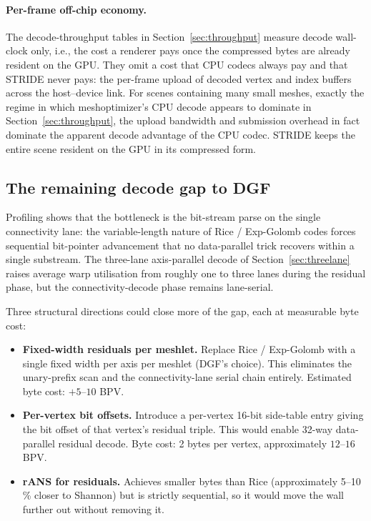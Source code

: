 \documentclass[pdflatex,sn-vancouver-num]{sn-jnl}%
\theoremstyle{thmstyleone}%
\theoremstyle{thmstyletwo}%
\theoremstyle{thmstylethree}%
\begin{document}
\paragraph{Per-frame off-chip economy.}
The decode-throughput tables in Section~\ref{sec:throughput} measure decode wall-clock only, i.e., the cost a renderer pays once the compressed bytes are already resident on the GPU. They omit a cost that CPU codecs always pay and that STRIDE never pays: the per-frame upload of decoded vertex and index buffers across the host--device link. For scenes containing many small meshes, exactly the regime in which meshoptimizer's CPU decode appears to dominate in Section~\ref{sec:throughput}, the upload bandwidth and submission overhead in fact dominate the apparent decode advantage of the CPU codec. STRIDE keeps the entire scene resident on the GPU in its compressed form.

\subsection{The remaining decode gap to DGF}\label{sec:gap}

Profiling shows that the bottleneck is the bit-stream parse on the single connectivity lane: the variable-length nature of Rice / Exp-Golomb codes forces sequential bit-pointer advancement that no data-parallel trick recovers within a single substream. The three-lane axis-parallel decode of Section~\ref{sec:threelane} raises average warp utilisation from roughly one to three lanes during the residual phase, but the connectivity-decode phase remains lane-serial.

Three structural directions could close more of the gap, each at measurable byte cost:

\begin{itemize}
\item \textbf{Fixed-width residuals per meshlet.} Replace Rice / Exp-Golomb with a single fixed width per axis per meshlet (DGF's choice). This eliminates the unary-prefix scan and the connectivity-lane serial chain entirely. Estimated byte cost: $+ 5$--$10$ BPV.
\item \textbf{Per-vertex bit offsets.} Introduce a per-vertex 16-bit side-table entry giving the bit offset of that vertex's residual triple. This would enable 32-way data-parallel residual decode. Byte cost: 2 bytes per vertex, approximately $12$--$16$ BPV.
\item \textbf{rANS for residuals.} Achieves smaller bytes than Rice (approximately 5--10\,\% closer to Shannon) but is strictly sequential, so it would move the wall further out without removing it.
\end{itemize}
\end{document}
